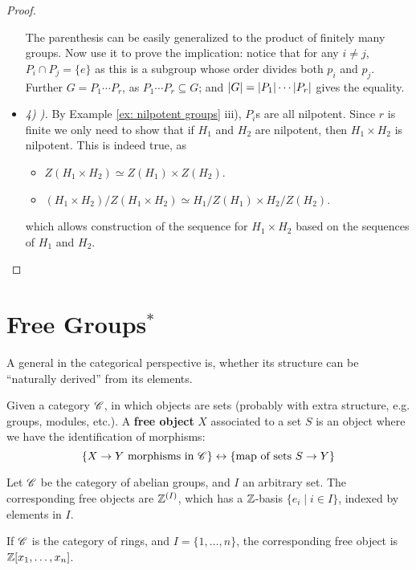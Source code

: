 \begin{proof}
\begin{itemize}
        The parenthesis can be easily generalized to the product of finitely many groups. Now use it to prove the implication: notice that for any $i \neq j$, $P_i \cap P_j = \{e\}$ as this is a subgroup whose order divides both $p_i$ and $p_j$. Further $G = P_1 \cdots P_r$, as $P_1 \cdots P_r \subseteq G$; and $\left|G\right| = \left|P_1\right| \cdots \left|P_r\right|$ gives the equality.
        \item \emph{4) ).} By Example \ref{ex: nilpotent groups} iii), $P_i$s are all nilpotent. Since $r$ is finite we only need to show that if $H_1$ and $H_2$ are nilpotent, then $H_1 \times H_2$ is nilpotent. This is indeed true, as
        \begin{itemize}
            \item $Z(H_1 \times H_2) \simeq Z(H_1) \times Z(H_2)$.
            \item $(H_1 \times H_2)/Z(H_1 \times H_2) \simeq H_1/Z(H_1) \times H_2/Z(H_2)$.
        \end{itemize}
        which allows construction of the sequence for $H_1 \times H_2$ based on the sequences of $H_1$ and $H_2$.
    \end{itemize}
\end{proof}

\section{Free Groups$^{\ast}$}

\textstart
A general in the categorical perspective is, whether its structure can be ``naturally derived'' from its elements.

\begin{definition}
    Given a category $\mathscr{C}$, in which objects are sets (probably with extra structure, e.g. groups, modules, etc.). A \textbf{free object} $X$ associated to a set $S$ is an object where we have the identification of morphisms:
    \[
        \{X \to Y \text{ morphisms in $\mathscr{C}$}\} \leftrightarrow \{ \text{map of sets $S \to Y$} \}
    \] 
\end{definition}

\begin{example}
    Let $\mathscr{C}$ be the category of abelian groups, and $I$ an arbitrary set. The corresponding free objects are $\mathbb{Z}^{(I)}$, which has a $\mathbb{Z}$-basis $\{e_i \mid i \in I\}$, indexed by elements in $I$. 

    If $\mathscr{C}$ is the category of rings, and $I = \{1, \dots, n\}$, the corresponding free object is $\mathbb{Z}[x_1, \dots, x_n]$.
\end{example}

